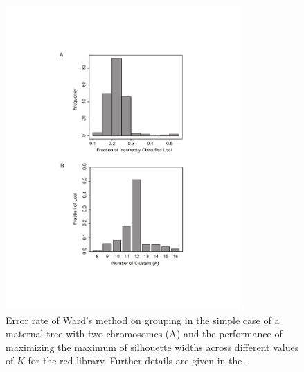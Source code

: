 \documentclass[11pt]{article}
\begin{document}
\begin{figure}[ht]
\centering
\includegraphics[width=0.8\textwidth]{misclassified}
\caption{Error rate of Ward's method on grouping in the simple case of a maternal tree with
two chromosomes (A) and the performance of maximizing the maximum of silhouette widths
across different values of $K$ for the red library. Further details are given in the .}
\label{f:misclassified.pdf}
\end{figure}

\clearpage
\end{document}
